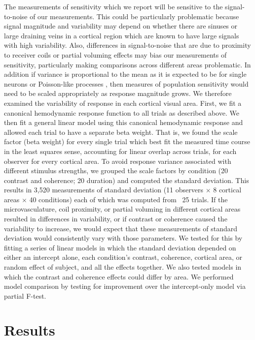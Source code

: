 The measurements of sensitivity which we report will be sensitive to the signal-to-noise of our measurements. This could be particularly problematic because signal magnitude and variability may depend on whether there are sinuses or large draining veins in a cortical region which are known to have large signals with high variability. Also, differences in signal-to-noise that are due to proximity to receiver coils or partial voluming effects may bias our measurements of sensitivity, particularly making comparisons across different areas problematic. In addition if variance is proportional to the mean as it is expected to be for single neurons or Poisson-like processes \citep{Softky1993-ki}, then measures of population sensitivity would need to be scaled appropriately as response magnitude grows. We therefore examined the variability of response in each cortical visual area. First, we fit a canonical hemodynamic response function to all trials as described above. We then fit a general linear model using this canonical hemodynamic response and allowed each trial to have a separate beta weight. That is, we found the scale factor (beta weight) for every single trial which best fit the measured time course in the least squares sense, accounting for linear overlap across trials, for each observer for every cortical area. To avoid response variance associated with different stimulus strengths, we grouped the scale factors by condition (20 contrast and coherence; 20 duration) and computed the standard deviation. This results in 3,520 measurements of standard deviation (11 observers $\times$ 8 cortical areas $\times$ 40 conditions) each of which was computed from ~25 trials. If the microvasculature, coil proximity, or partial voluming in different cortical areas resulted in differences in variability, or if contrast or coherence caused the variability to increase, we would expect that these measurements of standard deviation would consistently vary with those parameters. We tested for this by fitting a series of linear models in which the standard deviation depended on either an intercept alone, each condition’s contrast, coherence, cortical area, or random effect of subject, and all the effects together. We also tested models in which the contrast and coherence effects could differ by area. We performed model comparison by testing for improvement over the intercept-only model via partial F-test.


\section{Results}


